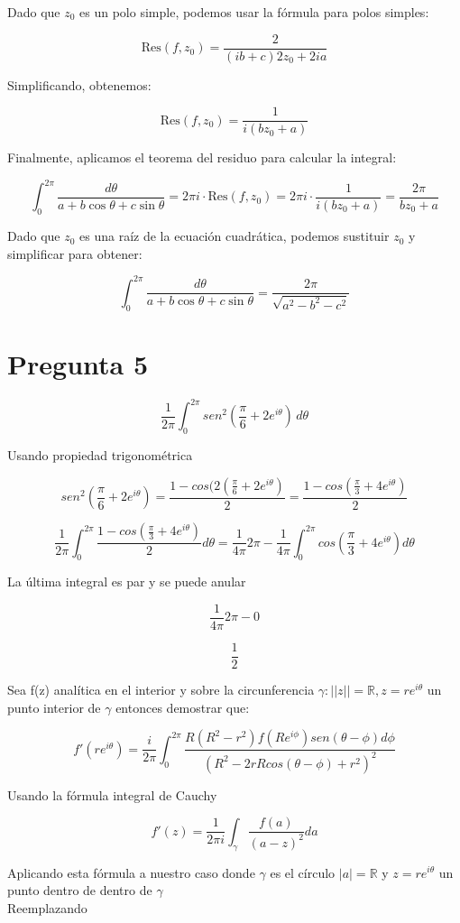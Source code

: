 \documentclass[a4paper,12pt]{article}
\begin{document}
Dado que \( z_0 \) es un polo simple, podemos usar la fórmula para polos simples:

\[
\text{Res}(f, z_0) = \frac{2}{(ib + c)2z_0 + 2ia}
\]

Simplificando, obtenemos:

\[
\text{Res}(f, z_0) = \frac{1}{i(b z_0 + a)}
\]


Finalmente, aplicamos el teorema del residuo para calcular la integral:

\[
\int_{0}^{2\pi} \frac{d\theta}{a + b\cos\theta + c\sin\theta} = 2\pi i \cdot \text{Res}(f, z_0) = 2\pi i \cdot \frac{1}{i(b z_0 + a)} = \frac{2\pi}{b z_0 + a}
\]

Dado que \( z_0 \) es una raíz de la ecuación cuadrática, podemos sustituir \( z_0 \) y simplificar para obtener:

\[
\int_{0}^{2\pi} \frac{d\theta}{a + b\cos\theta + c\sin\theta} = \frac{2\pi}{\sqrt{a^2 - b^2 - c^2}}
\]

\section*{Pregunta 5}

\[ \frac{1}{2\pi}\int_{0}^{2\pi} sen^2(\frac{\pi}{6}+2e^{i\theta}) \,d\theta \]

Usando propiedad trigonométrica

\[ sen^2(\frac{\pi}{6}+2e^{i\theta}) = \frac{1-cos(2(\frac{\pi}{6}+2e^{i\theta})}{2} = \frac{1-cos(\frac{\pi}{3}+4e^{i\theta})}{2}
 \]

 \[ \frac{1}{2\pi}\int_{0}^{2\pi}\frac{1-cos(\frac{\pi}{3}+4e^{i\theta})}{2}d\theta = \frac{1}{4\pi}2\pi-\frac{1}{4\pi}\int_0^{2\pi}cos(\frac{\pi}{3}+4e^{i\theta})d\theta
 \]

 La última integral es par y se puede anular

 \[ \frac{1}{4\pi}2\pi-0
 \]

  \[ \frac{1}{2}
 \]

Sea f(z) analítica en el interior y sobre la circunferencia $ \gamma:||z|| = \mathbb{R}, z = re^{i\theta} $ un punto interior de $\gamma$ entonces demostrar que:

\[ f'(re^{i\theta}) = \frac{i}{2\pi}\int_{0}^{2\pi} \frac{R (R^2-r^2)f(Re^{i\phi})sen(\theta-\phi)d\phi}{(R^2-2rRcos(\theta-\phi)+r^2)^2} \]

Usando la fórmula integral de Cauchy

\[ f'(z) = \frac{1}{2\pi i}\int_{\gamma}\frac{f(a)}{(a-z)^2}da \]

Aplicando esta fórmula a nuestro caso donde $\gamma$ es el círculo  $|a| = \mathbb{R}$ y $z = re^{i\theta}$ un punto dentro de dentro de $\gamma$ \\
Reemplazando
\end{document}

